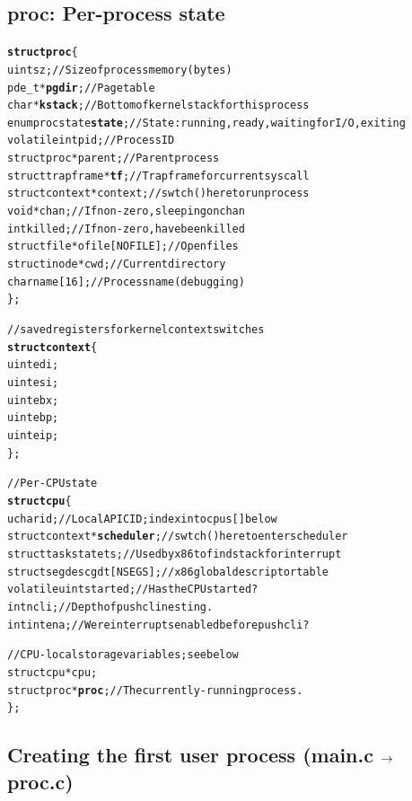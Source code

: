 \documentclass{note}
\begin{document}
\subsection{proc: Per-process state}
\begin{alltt}
  \textcolor{red2}{\textbf{struct proc}} \{
    uint sz;                     // Size of process memory (bytes)
    pde_t* \textbf{pgdir};                // Page table
    char *\textbf{kstack};                // Bottom of kernel stack for this process
    enum procstate \textbf{state};        // State: running, ready, waiting for I/O, exiting
    volatile int pid;            // Process ID
    struct proc *parent;         // Parent process
    struct trapframe *\textbf{tf};        // Trap frame for current syscall
    struct context *context;     // swtch() here to run process
    void *chan;                  // If non-zero, sleeping on chan
    int killed;                  // If non-zero, have been killed
    struct file *ofile[NOFILE];  // Open files
    struct inode *cwd;           // Current directory
    char name[16];               // Process name (debugging)
  \};

  // saved registers for kernel context switches
  \textcolor{red2}{\textbf{struct context}} \{
    uint edi;
    uint esi;
    uint ebx;
    uint ebp;
    uint eip;
  \};

  // Per-CPU state
  \textcolor{red2}{\textbf{struct cpu}} \{
    uchar id;                    // Local APIC ID; index into cpus[] below
    struct context *\textbf{scheduler};   // swtch() here to enter scheduler
    struct taskstate ts;         // Used by x86 to find stack for interrupt
    struct segdesc gdt[NSEGS];   // x86 global descriptor table
    volatile uint started;       // Has the CPU started?
    int ncli;                    // Depth of pushcli nesting.
    int intena;                  // Were interrupts enabled before pushcli?
  
    // CPU-local storage variables; see below
    struct cpu *cpu;
    struct proc *\textbf{proc};           // The currently-running process.
  \};
\end{alltt}

\subsection{Creating the first user process (main.c $\mbox{$\rightarrow$}$ proc.c)}
\end{document}
